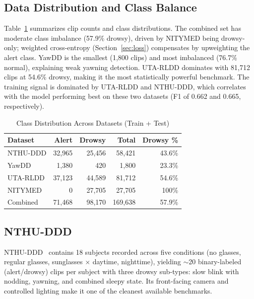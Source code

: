 \documentclass[journal]{IEEEtran}
\begin{document}
\subsection{Data Distribution and Class Balance}
\label{sec:data_dist}

Table~\ref{tab:class_balance} summarizes clip counts and class distributions. The combined set has moderate class imbalance (57.9\% drowsy), driven by NITYMED being drowsy-only; weighted cross-entropy (Section~\ref{sec:loss}) compensates by upweighting the alert class. YawDD is the smallest (1,800 clips) and most imbalanced (76.7\% normal), explaining weak yawning detection. UTA-RLDD dominates with 81,712 clips at 54.6\% drowsy, making it the most statistically powerful benchmark. The training signal is dominated by UTA-RLDD and NTHU-DDD, which correlates with the model performing best on these two datasets (F1 of 0.662 and 0.665, respectively).

\begin{table}[t]
  \caption{Class Distribution Across Datasets (Train + Test)}
  \label{tab:class_balance}
  \centering
  \small
  \begin{tabular}{lrrrr}
    \toprule
    Dataset & Alert & Drowsy & Total & Drowsy \% \\
    \midrule
    NTHU-DDD  & 32{,}965 & 25{,}456 & 58{,}421 & 43.6\% \\
    YawDD     & 1{,}380  & 420     & 1{,}800  & 23.3\% \\
    UTA-RLDD  & 37{,}123 & 44{,}589 & 81{,}712 & 54.6\% \\
    NITYMED   & 0       & 27{,}705 & 27{,}705 & 100\% \\
    \midrule
    Combined  & 71{,}468 & 98{,}170 & 169{,}638 & 57.9\% \\
    \bottomrule
  \end{tabular}
\end{table}

\subsection{NTHU-DDD}
\label{sec:ds_nthu}
NTHU-DDD~\cite{ghoddoosian2019} contains 18 subjects recorded across five conditions (no glasses, regular glasses, sunglasses $\times$ daytime, nighttime), yielding $\sim$20 binary-labeled (alert/drowsy) clips per subject with three drowsy sub-types: slow blink with nodding, yawning, and combined sleepy state. Its front-facing camera and controlled lighting make it one of the cleanest available benchmarks.
\end{document}
